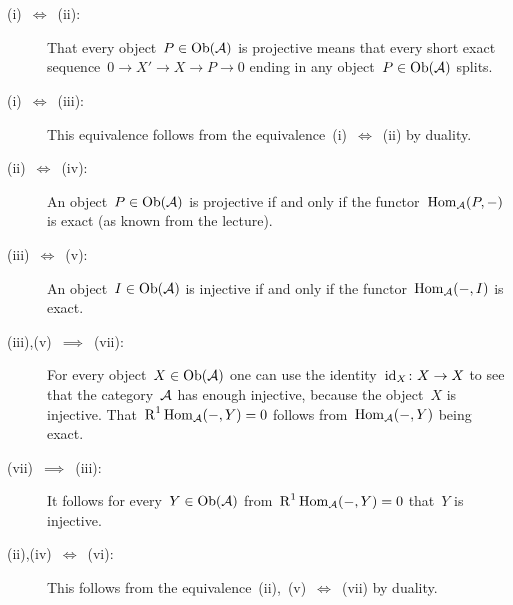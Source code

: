 \section{}


\begin{description}
  \item[(i)~$\iff$~(ii):]
    That every object~$P \in \operatorname{Ob}(\mathcal{A})$ is projective means that every short exact sequence~$0 \to X' \to X \to P \to 0$ ending in any object~$P \in \operatorname{Ob}(\mathcal{A})$ splits.
  \item[(i)~$\iff$~(iii):]
    This equivalence follows from the equivalence~(i)~$\iff$~(ii) by duality.
  \item[(ii)~$\iff$~(iv):]
    An object~$P \in \operatorname{Ob}(\mathcal{A})$ is projective if and only if the functor~$\operatorname{Hom}_{\mathcal{A}}(P,-)$ is exact (as known from the lecture).
  \item[(iii)~$\iff$~(v):]
    An object~$I \in \operatorname{Ob}(\mathcal{A})$ is injective if and only if the functor~$\operatorname{Hom}_{\mathcal{A}}(-,I)$ is exact.
  \item[(iii),(v)~$\implies$~(vii):]
    For every object~$X \in \operatorname{Ob}(\mathcal{A})$ one can use the identity~$\operatorname{id}_{X} \colon X \to X$ to see that the category~$\mathcal{A}$ has enough injective, because the object~$X$ is injective.
    That~$\operatorname{R}^1 \operatorname{Hom}_{\mathcal{A}}(-,Y) = 0$ follows from~$\operatorname{Hom}_{\mathcal{A}}(-,Y)$ being exact.
  \item[(vii)~$\implies$~(iii):]
    It follows for every~$Y \in \operatorname{Ob}(\mathcal{A})$ from~$\operatorname{R}^1 \operatorname{Hom}_{\mathcal{A}}(-,Y) = 0$ that~$Y$ is injective.
  \item[(ii),(iv)~$\iff$~(vi):]
    This follows from the equivalence~(ii),~(v)~$\iff$~(vii) by duality.
\end{description}
